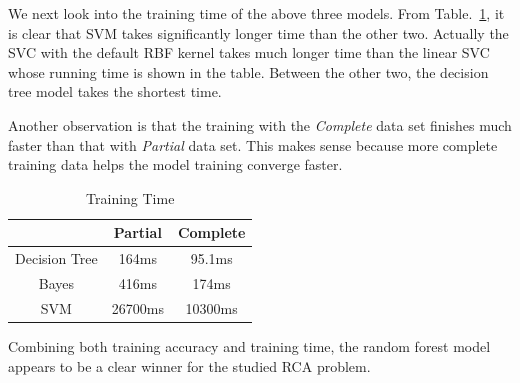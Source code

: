 We next look into the training time of the above three models. From Table.~\ref{tab:time}, it is clear that SVM takes significantly longer time than the other two. Actually the SVC with the default RBF kernel takes much longer time than the linear SVC whose running time is shown in the table. Between the other two, the decision tree model takes the shortest time.

Another observation is that the training with the {\it Complete} data set finishes much faster than that with {\it Partial} data set. This makes sense because more complete training data helps the model training converge faster. 

\begin{table}[!ht]
\caption{Training Time\label{tab:time}}
\begin{center}
\begin{tabular}{ |c|c|c| } 
 \hline
  & Partial & Complete \\ 
 \hline\hline
 Decision Tree & 164ms & 95.1ms \\ 
 \hline
 Bayes & 416ms & 174ms \\
 \hline
 SVM & 26700ms & 10300ms \\ 
 \hline
\end{tabular}
\end{center}
\end{table}

Combining both training accuracy and training time, the random forest model appears to be a clear winner for the studied RCA problem.